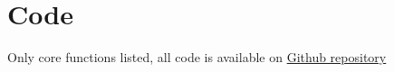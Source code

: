 \documentclass[english,12pt,a4paper]{report}
\begin{document}
	\chapter{Code}
	Only core functions listed, all code is available on \href{https://github.com/kamilix2003/two-body}{Github repository}
	
	
	
	
	
	
\end{document}
